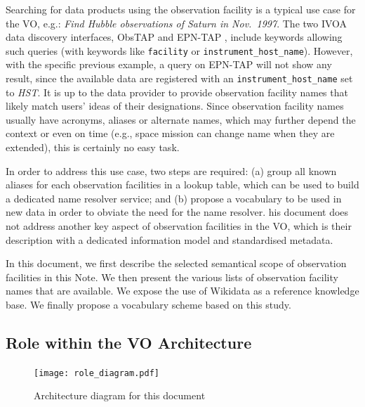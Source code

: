 \documentclass[11pt,a4paper]{ivoa}
\begin{document}
Searching for data products using the observation facility is a 
typical use case for the VO, e.g.: \emph{Find Hubble observations
of Saturn in Nov.\ 1997}. The two IVOA data discovery interfaces, 
ObsTAP \citep{2017ivoa.spec.0509L} and EPN-TAP \citep{ivoa:epntap}, 
include keywords allowing such queries (with keywords like 
\texttt{facility} or \texttt{instrument\_host\_name}). However, with 
the specific previous example, a query on EPN-TAP will not show any 
result, since the available data are registered with an 
\texttt{instrument\_host\_name} set to \emph{HST}. It is up to the 
data provider to provide observation facility names that likely match
users' ideas of their designations.  Since
observation facility names usually have acronyms, aliases or alternate 
names, which may further depend the context or even on 
time (e.g., space mission can change name when they are extended), this
is certainly no easy task.

In order to address this use case, two steps are required: (a) group
all known aliases for each observation facilities in a lookup table, 
which can be used to build a dedicated name resolver service; and 
(b) propose a vocabulary to be used in new data in order to obviate the
need for the name resolver.
his document does not address another key
aspect of observation facilities in the VO, which is their 
description with a dedicated information model and standardised 
metadata.

In this document, we first describe the selected semantical scope of 
observation facilities in this Note. We then present the various 
lists of observation facility names that are available. We expose the 
use of Wikidata as a reference knowledge base. We finally propose a 
vocabulary scheme based on this study. 

\subsection{Role within the VO Architecture}

\begin{figure}
\centering


\texttt{[image: role\_diagram.pdf]}
\caption{Architecture diagram for this document}
\label{fig:archdiag}
\end{figure}
\end{document}
